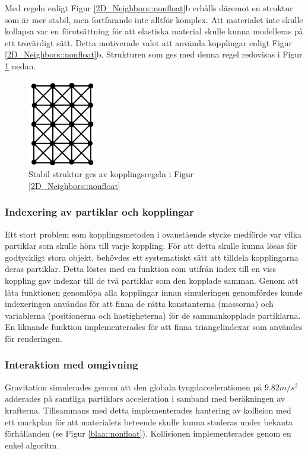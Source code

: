 \documentclass[a4paper,12pt,oneside,final,swedish]{extarticle}
\begin{document}
\noindent Med regeln enligt Figur \ref{2D_Neighbors::nonfloat}b erhålls däremot en struktur som är mer stabil, men fortfarande inte alltför komplex. Att materialet inte skulle kollapsa var en förutsättning för att elastiska material skulle kunna modelleras på ett trovärdigt sätt. Detta motiverade valet att använda kopplingar enligt Figur \ref{2D_Neighbors::nonfloat}b. Strukturen som ges med denna regel redovisas i Figur \ref{2D_stabil::nonfloat} nedan.

\begin{figure}[h!]
  \begin{center}
    \includegraphics[width=3cm]{Bilder/2D_stabil.png} 
  \end{center}
  \caption{Stabil struktur ges av kopplingsregeln i Figur \ref{2D_Neighbors::nonfloat} }
  \label{2D_stabil::nonfloat}
\end{figure}

\subsubsection{Indexering av partiklar och kopplingar}
Ett stort problem som kopplingsmetoden i ovanstående stycke medförde var vilka partiklar som skulle höra till varje koppling. För att detta skulle kunna lösas för godtyckligt stora objekt, behövdes ett systematiskt sätt att tilldela kopplingarna deras partiklar. Detta löstes med en funktion som utifrån index till en viss koppling gav indexar till de två partiklar som den kopplade samman. Genom att låta funktionen genomlöpa alla kopplingar innan simuleringen genomfördes kunde indexeringen användas för att finna de rätta konstanterna (massorna) och variablerna (positionerna och hastigheterna) för de sammankopplade partiklarna. En liknande funktion implementerades för att finna triangelindexar som användes för renderingen.

\subsubsection{Interaktion med omgivning}
Gravitation simulerades genom att den globala tyngdaccelerationen på \begin{math}9.82 m/s^2 \end{math} adderades på samtliga partiklars acceleration i samband med beräkningen av krafterna. Tillsammans med detta implementerades hantering av kollision med ett markplan för att materialets beteende skulle kunna studeras under bekanta förhållanden (se Figur \ref{blaa::nonfloat}). Kollisionen implementerades genom en enkel algoritm.
\end{document}
